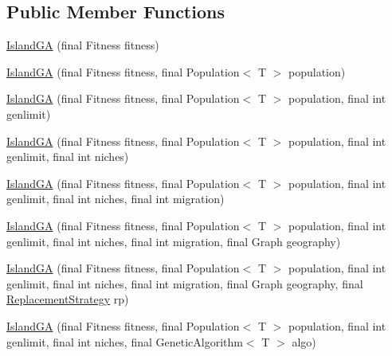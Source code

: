 \subsection*{Public Member Functions}
\begin{CompactItemize}
\item 
\hyperlink{classjenes_1_1algorithms_1_1_island_g_a_3_01_t_01extends_01_chromosome_01_4_e36c7bc43e9b6f50a74cd3c2be85d17b}{IslandGA} (final Fitness fitness)
\item 
\hyperlink{classjenes_1_1algorithms_1_1_island_g_a_3_01_t_01extends_01_chromosome_01_4_7e50ffddeef3cd18e479696e1d7258e4}{IslandGA} (final Fitness fitness, final Population$<$ T $>$ population)
\item 
\hyperlink{classjenes_1_1algorithms_1_1_island_g_a_3_01_t_01extends_01_chromosome_01_4_baca651c904eb2d4a89380444c3dfd52}{IslandGA} (final Fitness fitness, final Population$<$ T $>$ population, final int genlimit)
\item 
\hyperlink{classjenes_1_1algorithms_1_1_island_g_a_3_01_t_01extends_01_chromosome_01_4_462cff7f1ffe7db7a13ab925a8f85c50}{IslandGA} (final Fitness fitness, final Population$<$ T $>$ population, final int genlimit, final int niches)
\item 
\hyperlink{classjenes_1_1algorithms_1_1_island_g_a_3_01_t_01extends_01_chromosome_01_4_183f962ceb12d8cd2885b0ef4a6dd988}{IslandGA} (final Fitness fitness, final Population$<$ T $>$ population, final int genlimit, final int niches, final int migration)
\item 
\hyperlink{classjenes_1_1algorithms_1_1_island_g_a_3_01_t_01extends_01_chromosome_01_4_36fa940b12f68377764049c7898fd8bd}{IslandGA} (final Fitness fitness, final Population$<$ T $>$ population, final int genlimit, final int niches, final int migration, final Graph geography)
\item 
\hyperlink{classjenes_1_1algorithms_1_1_island_g_a_3_01_t_01extends_01_chromosome_01_4_1b122013a5bad475ec45c67737029e68}{IslandGA} (final Fitness fitness, final Population$<$ T $>$ population, final int genlimit, final int niches, final int migration, final Graph geography, final \hyperlink{classjenes_1_1algorithms_1_1_island_g_a_3_01_t_01extends_01_chromosome_01_4_eb0e7c4ddd30e9472cfd2a280544ff51}{ReplacementStrategy} rp)
\item 
\hyperlink{classjenes_1_1algorithms_1_1_island_g_a_3_01_t_01extends_01_chromosome_01_4_1347ad1ffe4f878c6f92d4a12484f174}{IslandGA} (final Fitness fitness, final Population$<$ T $>$ population, final int genlimit, final int niches, final GeneticAlgorithm$<$ T $>$ algo)

\end{CompactItemize}
